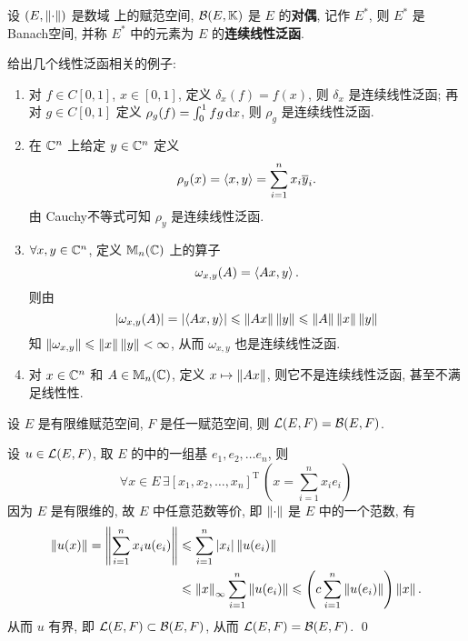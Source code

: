 	\begin{Definition}[线性泛函]\label{def:线性泛函}
		 设 $ (E, \left\| \cdot \right\|) $ 是数域 \K 上的赋范空间,  $ \mathcal{B}(E, \mathbb{K}) $ 是 $ E $ 的\textbf{对偶}, 记作 $ E^{*} $, 则 $ E^{*} $ 是Banach空间, 并称 $ E^{*} $ 中的元素为 $ E $ 的\textbf{连续线性泛函}.
	\end{Definition}
	\begin{Example}
		给出几个线性泛函相关的例子:
		\begin{enumerate}[(1)]
			\item  对 $ f\in C[0, 1] $, $ x\in [0, 1] $, 定义 $ \delta_{x}(f)=f(x) $, 则 $ \delta_{x} $ 是连续线性泛函; 再对 $ g\in C[0, 1] $ 定义 $ \rho_{g}(f)=\int_{0}^{1}fg\,\mathrm{d} x $, 则 $ \rho_{g} $ 是连续线性泛函.
			\item 在 $ \mathbb{C}^{n} $ 上给定 $ y\in\mathbb{C}^{n} $ 定义 
			 \[
				\rho_{y}(x)=\left\langle x, y \right\rangle=\sum_{i=1}^{n}x_{i}\overline{y}_{i}.
			\]
			由 Cauchy不等式可知 $ \rho_{y} $ 是连续线性泛函.
			\item $ \forall x, y\in \mathbb{C}^{n} $, 定义 $ \mathbb{M}_{n}(\mathbb{C}) $ 上的算子
			\[
				\omega_{x, y}(A)=\left\langle Ax, y \right\rangle.
			\]
			则由
			\[
				\left| \omega_{x, y}(A) \right| =\left| \left\langle Ax, y \right\rangle \right| \leqslant\left\| Ax \right\|\left\| y \right\|\leqslant\left\| A \right\|\left\| x \right\|\left\| y \right\|
			\]
			知 $ \left\| \omega_{x, y} \right\|\leqslant\left\| x \right\|\left\| y \right\|<\infty $, 从而 $ \omega_{x, y} $ 也是连续线性泛函.
			\item 对 $ x\in\mathbb{C}^{n} $ 和 $ A\in\mathbb{M}_{n}(\mathbb{C}) $, 定义 $ x\mapsto \left\| Ax \right\| $, 则它不是连续线性泛函, 甚至不满足线性性.
		\end{enumerate}
	\end{Example}

	\begin{Theorem}
		 设 $ E $ 是有限维赋范空间,  $ F $ 是任一赋范空间, 则 $ \mathcal{L}(E, F)=\mathcal{B}(E, F) $.  
	\end{Theorem}
	\begin{Proof}
		设 $ u\in\mathcal{L}(E, F) $, 取 $ E $ 的中的一组基 $ e_{1}, e_{2}, \dots e_{n} $, 则
		\[
			\forall x\in E\,\exists[x_{1}, x_{2}, \dots, x_{n}]^{\mathrm T}\,\left(x=\sum_{i=1}^{n}x_{i}e_{i}\right)
		\]
		因为 $ E $ 是有限维的, 故 $ E $ 中任意范数等价, 即 $ \left\| \cdot \right\| $ 是 $ E $ 中的一个范数, 有
		\[
			\begin{aligned}
				\left\| u(x) \right\|=\left\| \sum_{i=1}^{n}x_{i}u(e_{i}) \right\| & \leqslant \sum_{i=1}^{n}\left| x_{i} \right| \left\| u(e_{i}) \right\|\\
				& \leqslant\left\| x \right\|_{\infty}\sum_{i=1}^{n}\left\| u(e_{i}) \right\|\leqslant\left( c\sum_{i=1}^{n}\left\| u(e_{i}) \right\| \right)\left\| x \right\|.
			\end{aligned}
		\]
		从而 $ u $ 有界, 即 $ \mathcal{L}(E, F)\subset\mathcal{B}(E, F) $, 从而 $ \mathcal{L}(E, F)=\mathcal{B}(E, F) $. \qed
	\end{Proof}
	
